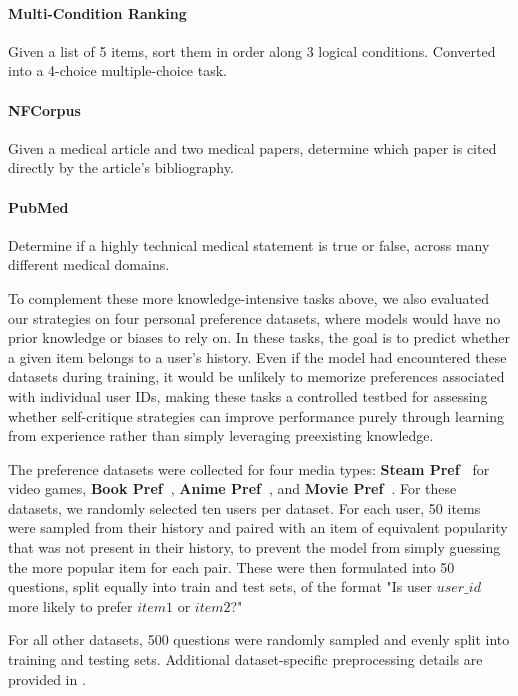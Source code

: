 \paragraph{Multi-Condition Ranking~\cite{multi_condition_ranking}} Given a list of 5 items, sort them in order along 3 logical conditions. Converted into a 4-choice multiple-choice task.

\paragraph{NFCorpus~\cite{NFCorpus}} Given a medical article and two medical papers, determine which paper is cited directly by the article's bibliography.

\paragraph{PubMed~\cite{pubmed}} Determine if a highly technical medical statement is true or false, across many different medical domains. \newline

To complement these more knowledge-intensive tasks above, we also evaluated our strategies on four personal preference datasets, where models would have no prior knowledge or biases to rely on. In these tasks, the goal is to predict whether a given item belongs to a user's history. Even if the model had encountered these datasets during training, it would be unlikely to memorize preferences associated with individual user IDs, making these tasks a controlled testbed for assessing whether self-critique strategies can improve performance purely through learning from experience rather than simply leveraging preexisting knowledge.

The preference datasets were collected for four media types: \textbf{Steam Pref~\cite{SteamPref}} for video games, \textbf{Book Pref~\cite{book_preference}}, \textbf{Anime Pref~\cite{AnimePref}}, and \textbf{Movie Pref~\cite{MoviePref}}. For these datasets, we randomly selected ten users per dataset. For each user, 50 items were sampled from their history and paired with an item of equivalent popularity that was not present in their history, to prevent the model from simply guessing the more popular item for each pair. These were then formulated into 50 questions, split equally into train and test sets, of the format "Is user $user\_id$ more likely to prefer $item1$ or $item2$?"

For all other datasets, 500 questions were randomly sampled and evenly split into training and testing sets. Additional dataset-specific preprocessing details are provided in .


